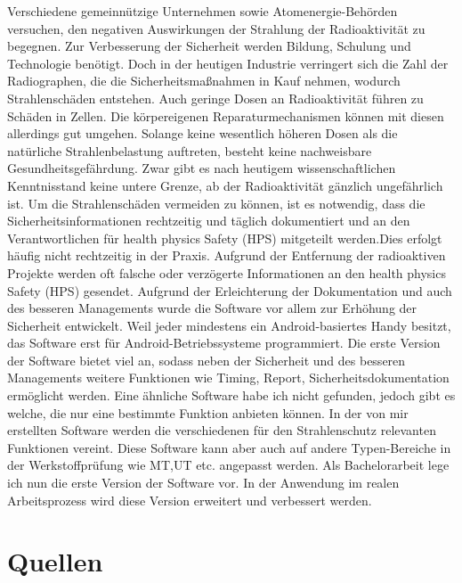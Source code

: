 {Verschiedene gemeinnützige Unternehmen sowie Atomenergie-Behörden versuchen, den negativen Auswirkungen der Strahlung der Radioaktivität zu begegnen.
Zur Verbesserung der Sicherheit werden Bildung, Schulung und Technologie benötigt.
Doch in der heutigen Industrie verringert sich die Zahl der Radiographen, die die Sicherheitsmaßnahmen in Kauf nehmen, wodurch Strahlenschäden entstehen.
Auch geringe Dosen an Radioaktivität führen zu Schäden in Zellen. Die körpereigenen Reparaturmechanismen können mit diesen allerdings gut umgehen.
Solange keine wesentlich höheren Dosen als die natürliche Strahlenbelastung auftreten, besteht keine nachweisbare Gesundheitsgefährdung.
Zwar gibt es nach heutigem wissenschaftlichen Kenntnisstand keine untere Grenze, ab der Radioaktivität gänzlich ungefährlich ist.
Um die Strahlenschäden vermeiden zu können, ist es notwendig, dass die Sicherheitsinformationen rechtzeitig und täglich dokumentiert und an den Verantwortlichen für health physics Safety (HPS) mitgeteilt werden.Dies erfolgt häufig nicht rechtzeitig in der Praxis.
Aufgrund der Entfernung der radioaktiven Projekte werden oft falsche oder verzögerte Informationen an den health physics Safety (HPS) gesendet.
Aufgrund der Erleichterung der Dokumentation und auch des besseren Managements wurde die Software vor allem zur Erhöhung der Sicherheit entwickelt.  
Weil jeder mindestens ein Android-basiertes Handy besitzt, das Software erst für Android-Betriebssysteme programmiert.
Die erste Version der Software bietet viel an, sodass neben der Sicherheit und des besseren Managements weitere Funktionen wie Timing, Report, Sicherheitsdokumentation ermöglicht werden.
Eine ähnliche Software habe ich nicht gefunden, jedoch gibt es welche, die nur eine bestimmte Funktion anbieten können.
In der von mir erstellten Software werden die verschiedenen für den Strahlenschutz relevanten Funktionen vereint.
Diese Software kann aber auch auf andere Typen-Bereiche in der Werkstoffprüfung wie MT,UT etc.
angepasst werden.
Als Bachelorarbeit lege ich nun die erste Version der Software vor.
In der Anwendung im realen Arbeitsprozess wird diese Version erweitert und verbessert werden.
 
\section{Quellen}
\label{sec:quellen}

}

